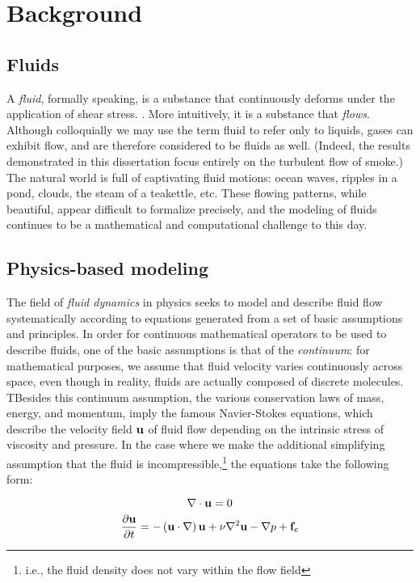 \chapter[Background]{Background}
\label{chap:chap3}
\section{Fluids}

A {\em fluid}, formally speaking, is a substance that continuously deforms under the application of shear stress. . More intuitively, it is a substance that {\em flows}. Although colloquially we may use the term fluid to refer only to liquids, gases can exhibit flow, and are therefore considered to be fluids as well. (Indeed, the results demonstrated in this dissertation focus entirely on the turbulent flow of smoke.) The natural world is full of captivating fluid motions: ocean waves, ripples in a pond, clouds, the steam of a teakettle, etc. These flowing patterns, while beautiful, appear difficult to formalize precisely, and the modeling of fluids continues to be a mathematical and computational challenge to this day.

\section{Physics-based modeling}
The field of {\em fluid dynamics} in physics seeks to model and describe fluid flow systematically according to equations generated from a set of basic assumptions and principles. In order for continuous mathematical operators to be used to describe fluids, one of the basic assumptions is that of the {\em continuum}: for mathematical purposes, we assume that fluid velocity varies continuously across space, even though in reality, fluids are actually composed of discrete molecules. TBesides this continuum assumption, the various conservation laws of mass, energy, and momentum, imply the famous Navier-Stokes equations, which describe the velocity field $\mathbf{u}$ of fluid flow depending on the intrinsic stress of viscosity and pressure. In the case where we make the additional simplifying assumption that the fluid is incompressible,\footnote{i.e., the fluid density does not vary within the flow field} the equations take the following form:

\begin{equation}
\label{eq:incompress}
\nabla \cdot \mathbf{u} = 0
\end{equation}
\begin{equation}
\label{eq:momentum}
\frac{\partial \mathbf{u}}{\partial t} = -\left(\mathbf{u} \cdot \nabla \right)\mathbf{u} + \nu \nabla^{2}\mathbf{u} - \nabla{p} + \mathbf{f}_e
\end{equation}

